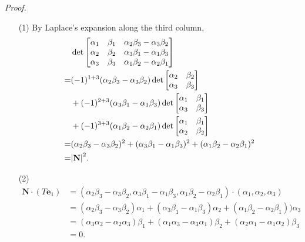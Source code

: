 \documentclass{article}
\begin{document}
\emph{Proof.}
\begin{enumerate}
\item[(1)]
  By Laplace's expansion along the third column,
    \begin{align*}
    &\det\begin{bmatrix}
      \alpha_1 & \beta_1 & \alpha_2 \beta_3 - \alpha_3 \beta_2 \\
      \alpha_2 & \beta_2 & \alpha_3 \beta_1 - \alpha_1 \beta_3 \\
      \alpha_3 & \beta_3 & \alpha_1 \beta_2 - \alpha_2 \beta_1
    \end{bmatrix} \\
    =& (-1)^{1+3} (\alpha_2 \beta_3 - \alpha_3 \beta_2)
      \det\begin{bmatrix}
        \alpha_2 & \beta_2 \\
        \alpha_3 & \beta_3
      \end{bmatrix} \\
      &+ (-1)^{2+3} (\alpha_3 \beta_1 - \alpha_1 \beta_3)
      \det\begin{bmatrix}
        \alpha_1 & \beta_1 \\
        \alpha_3 & \beta_3
      \end{bmatrix} \\
      &+ (-1)^{3+3} (\alpha_1 \beta_2 - \alpha_2 \beta_1)
      \det\begin{bmatrix}
        \alpha_1 & \beta_1 \\
        \alpha_2 & \beta_2
      \end{bmatrix} \\
    =& (\alpha_2 \beta_3 - \alpha_3 \beta_2)^2
      + (\alpha_3 \beta_1 - \alpha_1 \beta_3)^2
      + (\alpha_1 \beta_2 - \alpha_2 \beta_1)^2 \\
    =& \abs{\mathbf{N}}^2.
  \end{align*}

\item[(2)]
  \begin{align*}
    \mathbf{N} \cdot (T\mathbf{e}_1)
    &= (\alpha_2 \beta_3 - \alpha_3 \beta_2,
      \alpha_3 \beta_1 - \alpha_1 \beta_3,
      \alpha_1 \beta_2 - \alpha_2 \beta_1) \cdot
      (\alpha_1, \alpha_2, \alpha_3) \\
    &= (\alpha_2 \beta_3 - \alpha_3 \beta_2) \alpha_1
      + (\alpha_3 \beta_1 - \alpha_1 \beta_3) \alpha_2
      + (\alpha_1 \beta_2 - \alpha_2 \beta_1)) \alpha_3 \\
    &= (\alpha_3 \alpha_2 - \alpha_2 \alpha_3) \beta_1
      + (\alpha_1 \alpha_3 - \alpha_3 \alpha_1) \beta_2
      + (\alpha_2 \alpha_1 - \alpha_1 \alpha_2)\beta_3 \\
    &= 0.
  \end{align*}


\end{enumerate}
\end{document}

